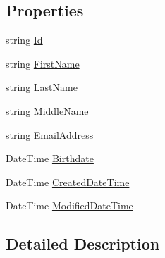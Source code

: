 \subsection*{Properties}
\begin{DoxyCompactItemize}
\item 
string \hyperlink{interface_plex_byte_1_1_mo_cap_1_1_security_1_1_i_person_ac9e7eb738b289315473d898eef447acf}{Id}
\item 
string \hyperlink{interface_plex_byte_1_1_mo_cap_1_1_security_1_1_i_person_aeddc80d36377ce378de21a5aea8ac574}{First\+Name}
\item 
string \hyperlink{interface_plex_byte_1_1_mo_cap_1_1_security_1_1_i_person_ab4e080812cf1517ef2e3a56295b0965d}{Last\+Name}
\item 
string \hyperlink{interface_plex_byte_1_1_mo_cap_1_1_security_1_1_i_person_aa42342d7ddfa8f866c9b64d655e04f26}{Middle\+Name}
\item 
string \hyperlink{interface_plex_byte_1_1_mo_cap_1_1_security_1_1_i_person_a4662f6c71cabe18c5448e8d0c34a3c62}{Email\+Address}
\item 
Date\+Time \hyperlink{interface_plex_byte_1_1_mo_cap_1_1_security_1_1_i_person_a4cb33b61b1369fadd6c47c15754e8b46}{Birthdate}
\item 
Date\+Time \hyperlink{interface_plex_byte_1_1_mo_cap_1_1_security_1_1_i_person_a56f8b21246addbb7558331981695724f}{Created\+Date\+Time}
\item 
Date\+Time \hyperlink{interface_plex_byte_1_1_mo_cap_1_1_security_1_1_i_person_a22533c8d75c245c3d5c4488e4e461751}{Modified\+Date\+Time}
\end{DoxyCompactItemize}


\subsection{Detailed Description}



